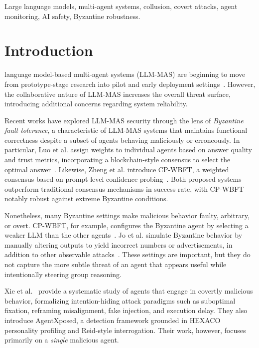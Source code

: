 \documentclass[journal]{IEEEtran}
\begin{document}
\begin{IEEEkeywords}
Large language models, multi-agent systems, collusion, covert attacks, agent monitoring, AI safety, Byzantine robustness.
\end{IEEEkeywords}

\IEEEpeerreviewmaketitle

\section{Introduction}
\label{sec:intro}

 language model-based multi-agent systems (LLM-MAS) are beginning to move from prototype-stage research into pilot and early deployment settings~\cite{renney2026llmmas}. However, the collaborative nature of LLM-MAS increases the overall threat surface, introducing additional concerns regarding system reliability.

Recent works have explored LLM-MAS security through the lens of \emph{Byzantine fault tolerance}, a characteristic of LLM-MAS systems that maintains functional correctness despite a subset of agents behaving maliciously or erroneously. In particular, Luo et al. assign weights to individual agents based on answer quality and trust metrics, incorporating a blockchain-style consensus to select the optimal answer~\cite{luo2025wbft}. Likewise, Zheng et al. introduce CP-WBFT, a weighted consensus based on prompt-level confidence probing~\cite{zheng2025rethinking}. Both proposed systems outperform traditional consensus mechanisms in success rate, with CP-WBFT notably robust against extreme Byzantine conditions.

Nonetheless, many Byzantine settings make malicious behavior faulty, arbitrary, or overt. CP-WBFT, for example, configures the Byzantine agent by selecting a weaker LLM than the other agents~\cite{zheng2025rethinking}. Jo et al. simulate Byzantine behavior by manually altering outputs to yield incorrect numbers or advertisements, in addition to other observable attacks~\cite{jo2025decentllms}. These settings are important, but they do not capture the more subtle threat of an agent that appears useful while intentionally steering group reasoning.

Xie et al.~\cite{xie2025mole} provide a systematic study of agents that engage in covertly malicious behavior, formalizing intention-hiding attack paradigms such as suboptimal fixation, reframing misalignment, fake injection, and execution delay. They also introduce AgentXposed, a detection framework grounded in HEXACO personality profiling and Reid-style interrogation. Their work, however, focuses primarily on a \emph{single} malicious agent.
\end{document}
